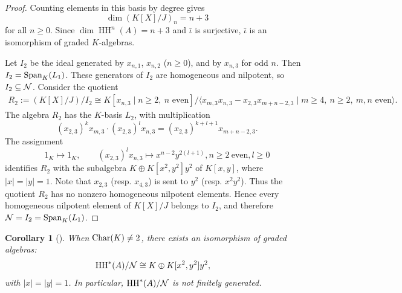 \documentclass[10pt, reqno]{amsart}
\newtheorem{corollary}[theorem]{Corollary}
\theoremstyle{definition}
\theoremstyle{remark}
\numberwithin{equation}{section}
\begin{document}
\begin{proof}
Counting elements in this basis by degree gives
\[
\dim (K[X]/J)_n = n+3
\]
for all \(n\ge 0\). Since \(\dim \operatorname{HH}^n(A)=n+3\) and \(\bar{\iota}\) is surjective, \(\bar{\iota}\) is an isomorphism of graded \(K\)-algebras.

Let $I_2$ be the ideal generated by $x_{n,1}$, $x_{n,2}$ ($n\ge0$), and by $x_{n,3}$ for odd $n$. Then $I_2= \mathrm{Span}_K(L_1)$. These generators of $I_2$ are homogeneous and nilpotent, so $I_2\subseteq\mathcal{N}$. 
Consider the quotient
$$\begin{aligned}
 R_2:=(K[X]/J)/I_2 \cong K[x_{n,3} \mid n\ge 2,\ n \text{ even}]/\langle x_{m,3}x_{n,3}-x_{2,3}x_{m+n-2,3} \mid m\ge4,\ n\ge2,\ m,n\text{ even}\rangle.
\end{aligned}$$
The algebra $R_2$ has the $K$-basis $L_2$, with multiplication
\[(x_{2,3})^kx_{m,3}\cdot (x_{2,3})^lx_{n,3} = (x_{2,3})^{k+l+1}x_{m+n-2,3}.\]
The assignment
 \[
    1_K\mapsto 1_K,\qquad (x_{2,3})^l x_{n,3}\mapsto x^{n-2}y^{2(l+1)}, n\geq 2\  \mathrm{even}, l\geq 0
\]
identifies $R_2$ with the subalgebra $K\oplus K[x^2,y^2]y^2$ of $K[x,y]$, where \(|x|=|y|=1\). Note that $x_{2,3}$ (resp. $x_{4,3}$) is sent to $y^2$ (resp. $x^2 y^2$). Thus the quotient $R_2$ has no nonzero homogeneous nilpotent elements. Hence
every homogeneous nilpotent element of $K[X]/J$ belongs to $I_2$, and therefore $\mathcal{N}=I_2=\operatorname{Span}_K(L_1)$.
\end{proof}

\begin{corollary}[{\cite[Theorem 4.5]{Sna09}}]
When $\mathrm{Char}(K)\neq 2$, there exists  an isomorphism of graded algebras:
 \[ \begin{aligned}
         \mathrm{HH}^*(A)/\mathcal{N} 
         &\cong  K \oplus K[x^2,y^2]y^2,
    \end{aligned}
    \]
with \(|x|=|y|=1\).
In particular, \(\mathrm{HH}^*(A)/\mathcal{N}\) is not finitely generated.    
\end{corollary}

\end{document}
